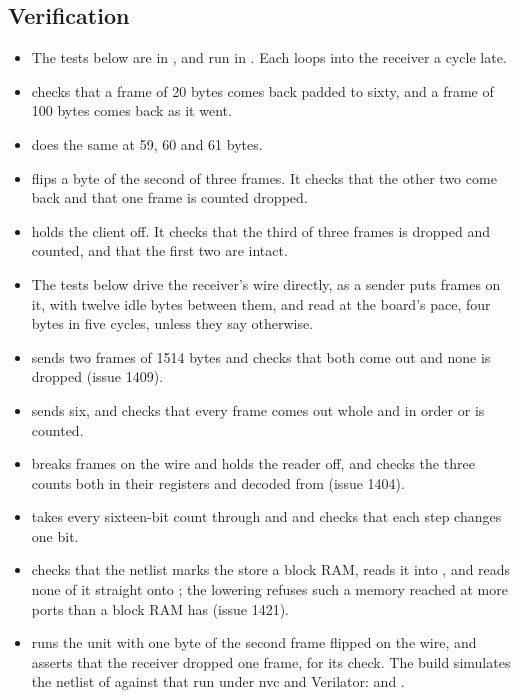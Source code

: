 \subsection*{Verification}

\begin{itemize}
\item The tests below are in , and run in
. Each loops  into the
receiver a cycle late.
\item {}
checks that a frame of 20 bytes comes back padded to sixty, and a frame
of 100 bytes comes back as it went.
\item {} does the same at 59, 60
and 61 bytes.
\item {} flips a byte of the second
of three frames. It checks that the other two come back and that one
frame is counted dropped.
\item {} holds the
client off. It checks that the third of three frames is dropped and
counted, and that the first two are intact.
\item The tests below drive the receiver's wire directly, as a sender
puts frames on it, with twelve idle bytes between them, and read at
the board's pace, four bytes in five cycles, unless they say
otherwise.
\item {}
sends two frames of 1514 bytes and checks that both come out and none
is dropped (issue 1409).
\item {}
sends six, and checks that every frame comes out whole and in order or
is counted.
\item {} breaks frames on the wire
and holds the reader off, and checks the three counts both in their
registers and decoded from  (issue 1404).
\item {} takes every sixteen-bit
count through  and  and checks that each
step changes one bit.
\item {} checks
that the netlist marks the store a block RAM, reads it into ,
and reads none of it straight onto ; the lowering refuses such
a memory reached at more ports than a block RAM has (issue 1421).
\item {} runs the unit with one byte of the second frame
flipped on the wire, and asserts that the receiver dropped one frame,
for its check.
The build simulates the netlist of  against that run under
nvc and Verilator: 
and .
\end{itemize}

